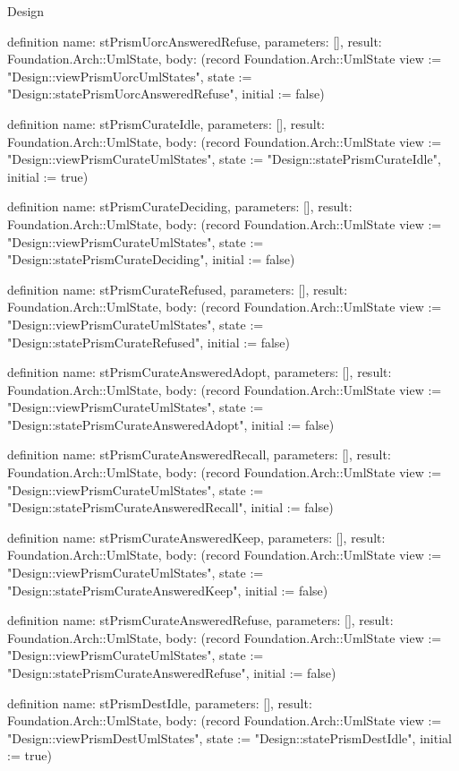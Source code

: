 \begin{lexlean}{Design}
\begin{semanticmodule}
definition{
  name: stPrismUorcAnsweredRefuse,
  parameters: [],
  result: Foundation.Arch::UmlState,
  body: (record Foundation.Arch::UmlState {view := "Design::viewPrismUorcUmlStates", state := "Design::statePrismUorcAnsweredRefuse", initial := false})
}

definition{
  name: stPrismCurateIdle,
  parameters: [],
  result: Foundation.Arch::UmlState,
  body: (record Foundation.Arch::UmlState {view := "Design::viewPrismCurateUmlStates", state := "Design::statePrismCurateIdle", initial := true})
}

definition{
  name: stPrismCurateDeciding,
  parameters: [],
  result: Foundation.Arch::UmlState,
  body: (record Foundation.Arch::UmlState {view := "Design::viewPrismCurateUmlStates", state := "Design::statePrismCurateDeciding", initial := false})
}

definition{
  name: stPrismCurateRefused,
  parameters: [],
  result: Foundation.Arch::UmlState,
  body: (record Foundation.Arch::UmlState {view := "Design::viewPrismCurateUmlStates", state := "Design::statePrismCurateRefused", initial := false})
}

definition{
  name: stPrismCurateAnsweredAdopt,
  parameters: [],
  result: Foundation.Arch::UmlState,
  body: (record Foundation.Arch::UmlState {view := "Design::viewPrismCurateUmlStates", state := "Design::statePrismCurateAnsweredAdopt", initial := false})
}

definition{
  name: stPrismCurateAnsweredRecall,
  parameters: [],
  result: Foundation.Arch::UmlState,
  body: (record Foundation.Arch::UmlState {view := "Design::viewPrismCurateUmlStates", state := "Design::statePrismCurateAnsweredRecall", initial := false})
}

definition{
  name: stPrismCurateAnsweredKeep,
  parameters: [],
  result: Foundation.Arch::UmlState,
  body: (record Foundation.Arch::UmlState {view := "Design::viewPrismCurateUmlStates", state := "Design::statePrismCurateAnsweredKeep", initial := false})
}

definition{
  name: stPrismCurateAnsweredRefuse,
  parameters: [],
  result: Foundation.Arch::UmlState,
  body: (record Foundation.Arch::UmlState {view := "Design::viewPrismCurateUmlStates", state := "Design::statePrismCurateAnsweredRefuse", initial := false})
}

definition{
  name: stPrismDestIdle,
  parameters: [],
  result: Foundation.Arch::UmlState,
  body: (record Foundation.Arch::UmlState {view := "Design::viewPrismDestUmlStates", state := "Design::statePrismDestIdle", initial := true})
}


\end{semanticmodule}
\end{lexlean}
